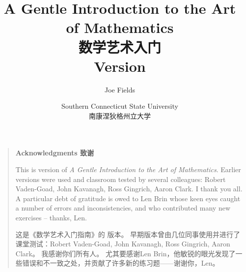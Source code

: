 \documentclass[12pt,twoside]{book}
\begin{document}
\frontmatter

\title{A Gentle Introduction to the Art of Mathematics \\ 数学艺术入门 \\{\small Version \versionNum {} }}
\author{Joe Fields}
\date{Southern Connecticut State University \\ 南康涅狄格州立大学}

\maketitle

\clearpage



\clearpage

\rule{0pt}{0pt}

\vfill

\begin{quote}
  {\Large \bf Acknowledgments 致谢}

  This is version \versionNum of {\em A Gentle Introduction to the Art of Mathematics}.
  Earlier versions were used and classroom tested by several colleagues:
  Robert Vaden-Goad, John Kavanagh, Ross Gingrich, Aaron Clark.
  I thank you all.
  A particular debt of gratitude is owed to Len Brin whose keen eyes caught
  a number of errors and inconsistencies, and who contributed many new
  exercises -- thanks, Len.

  这是《数学艺术入门指南》的 \versionNum 版本。
  早期版本曾由几位同事使用并进行了课堂测试：Robert Vaden-Goad, John Kavanagh, Ross Gingrich, Aaron Clark。
  我感谢你们所有人。
  尤其要感谢Len Brin，他敏锐的眼光发现了一些错误和不一致之处，并贡献了许多新的练习题——谢谢你，Len。
\end{quote}

\vfill


\clearpage

\tableofcontents

\listoffigures

\listoftables

%
%

\mainmatter













{}%


%

{}
\printindex
\end{document}
